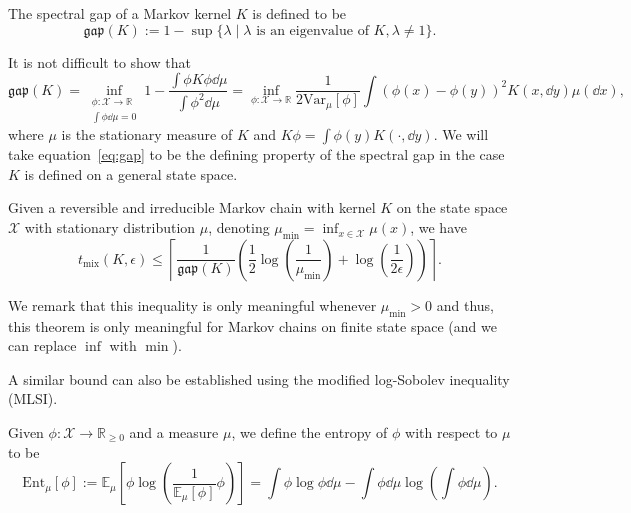 \begin{definition}
  The spectral gap of a Markov kernel \(K\) is defined to be 
  \[\mathfrak{gap}(K) := 1 - \sup\{\lambda \mid \lambda \text{ is an eigenvalue of } K, \lambda \neq 1\}.\]
\end{definition}

It is not difficult to show that 
\begin{equation}\label{eq:gap}
  \mathfrak{gap}(K) = 
    \inf_{\substack{\phi : \mathcal{X} \to \mathbb{R}\\ \int \phi \dd \mu = 0}} 1 
      - \frac{\int \phi K \phi \dd \mu}{\int \phi^2 \dd \mu}
    = \inf_{\phi : \mathcal{X} \to \mathbb{R}} 
      \frac{1}{2 \text{Var}_\mu[\phi]} \int (\phi(x) - \phi(y))^2 K(x, \dd y) \mu(\dd x),
\end{equation}
where \(\mu\) is the stationary measure of \(K\) and \(K\phi = \int \phi(y) K(\cdot, \dd y)\). We will take 
equation~\eqref{eq:gap} to be the defining property of the spectral gap in the case \(K\) is defined on 
a general state space.

\begin{theorem}\label{thm:levin}
  Given a reversible and irreducible Markov chain with kernel \(K\) on the state space \(\mathcal{X}\) 
  with stationary distribution \(\mu\), denoting \(\mu_{\min} = \inf_{x \in \mathcal{X}} \mu(x)\), we have 
  \[t_{\text{mix}}(K, \epsilon) \le \left\lceil\frac{1}{\mathfrak{gap}(K)}
    \left(\frac{1}{2}\log\left(\frac{1}{\mu_{\min}}\right) + \log\left(\frac{1}{2\epsilon}\right)\right)\right\rceil.\]
\end{theorem}

We remark that this inequality is only meaningful whenever \(\mu_{\min} > 0\) and thus, this theorem is 
only meaningful for Markov chains on finite state space (and we can replace \(\inf\) with \(\min\)).

A similar bound can also be established using the modified log-Sobolev inequality (MLSI).

\begin{definition}
  Given \(\phi : \mathcal{X} \to \mathbb{R}_{\ge 0}\) and a measure \(\mu\), we define the entropy of \(\phi\) 
  with respect to \(\mu\) to be 
  \[\text{Ent}_\mu[\phi] := \mathbb{E}_\mu\left[\phi \log\left(\frac{1}{\mathbb{E}_\mu[\phi]} \phi\right)\right]
   = \int \phi \log \phi \dd \mu - \int \phi \dd \mu \log\left(\int \phi \dd \mu\right).\]
\end{definition}

